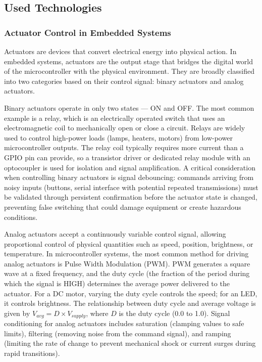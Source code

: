 \subsection{Used Technologies}

\subsubsection{Actuator Control in Embedded Systems}

Actuators are devices that convert electrical energy into physical action. In embedded systems, actuators are the output stage that bridges the digital world of the microcontroller with the physical environment. They are broadly classified into two categories based on their control signal: binary actuators and analog actuators.

Binary actuators operate in only two states --- ON and OFF. The most common example is a relay, which is an electrically operated switch that uses an electromagnetic coil to mechanically open or close a circuit. Relays are widely used to control high-power loads (lamps, heaters, motors) from low-power microcontroller outputs. The relay coil typically requires more current than a GPIO pin can provide, so a transistor driver or dedicated relay module with an optocoupler is used for isolation and signal amplification. A critical consideration when controlling binary actuators is signal debouncing: commands arriving from noisy inputs (buttons, serial interface with potential repeated transmissions) must be validated through persistent confirmation before the actuator state is changed, preventing false switching that could damage equipment or create hazardous conditions.

Analog actuators accept a continuously variable control signal, allowing proportional control of physical quantities such as speed, position, brightness, or temperature. In microcontroller systems, the most common method for driving analog actuators is Pulse Width Modulation (PWM). PWM generates a square wave at a fixed frequency, and the duty cycle (the fraction of the period during which the signal is HIGH) determines the average power delivered to the actuator. For a DC motor, varying the duty cycle controls the speed; for an LED, it controls brightness. The relationship between duty cycle and average voltage is given by $V_{avg} = D \times V_{supply}$, where $D$ is the duty cycle (0.0 to 1.0). Signal conditioning for analog actuators includes saturation (clamping values to safe limits), filtering (removing noise from the command signal), and ramping (limiting the rate of change to prevent mechanical shock or current surges during rapid transitions).

